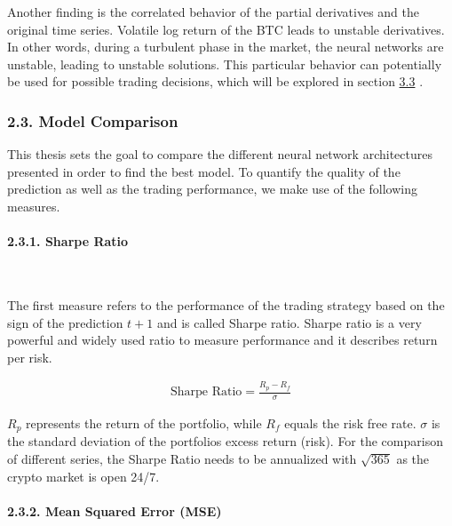 \documentclass[
]{article}
\begin{document}
Another finding is the correlated behavior of the partial derivatives
and the original time series. Volatile log return of the BTC leads to
unstable derivatives. In other words, during a turbulent phase in the
market, the neural networks are unstable, leading to unstable solutions.
This particular behavior can potentially be used for possible trading
decisions, which will be explored in section
\protect\hyperlink{trading-strat}{3.3} .

\newpage

\hypertarget{model_comparison}{%
\subsubsection{2.3. Model Comparison}\label{model_comparison}}

This thesis sets the goal to compare the different neural network
architectures presented in order to find the best model. To quantify the
quality of the prediction as well as the trading performance, we make
use of the following measures.

\hypertarget{sharpe_ratio}{%
\paragraph{2.3.1. Sharpe Ratio}\label{sharpe_ratio}}

~

The first measure refers to the performance of the trading strategy
based on the sign of the prediction \(t+1\) and is called Sharpe ratio.
Sharpe ratio is a very powerful and widely used ratio to measure
performance and it describes return per risk.

\begin{align} \label{eq:Sharpe}
  \text{Sharpe Ratio} = \frac{R_{p}-R_{f}}{\sigma}
\end{align}

\(R_{p}\) represents the return of the portfolio, while \(R_{f}\) equals
the risk free rate. \(\sigma\) is the standard deviation of the
portfolios excess return (risk). For the comparison of different series,
the Sharpe Ratio needs to be annualized with \(\sqrt{365}\) as the
crypto market is open 24/7.

\hypertarget{MSE}{%
\paragraph{2.3.2. Mean Squared Error (MSE)}\label{MSE}}

~
\end{document}
